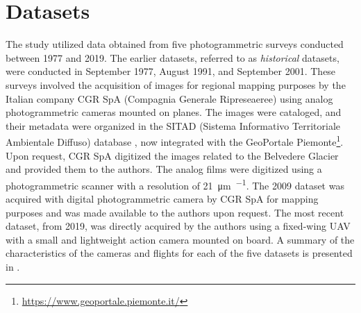 

\section{Datasets}\label{sec:2:datasets}

The study utilized data obtained from five photogrammetric surveys conducted between 1977 and 2019. The earlier datasets, referred to as \textit{historical} datasets, were conducted in September 1977, August 1991, and September 2001. 
These surveys involved the acquisition of images for regional mapping purposes by the Italian company CGR SpA (Compagnia Generale Ripreseaeree) using analog photogrammetric cameras mounted on planes. 
The images were cataloged, and their metadata were organized in the SITAD (Sistema Informativo Territoriale Ambientale Diffuso) database \citep{Cipriano2005_SITAD}, now integrated with the GeoPortale Piemonte\footnote{\url{ https://www.geoportale.piemonte.it/}}.
Upon request, CGR SpA digitized the images related to the Belvedere Glacier and provided them to the authors. 
The analog films were digitized using a photogrammetric scanner with a resolution of \SI{21}{\micro\meter\per\pixel}. 
The 2009 dataset was acquired with digital photogrammetric camera by CGR SpA for mapping purposes and was made available to the authors upon request.
The most recent dataset, from 2019, was directly acquired by the authors using a fixed-wing UAV with a small and lightweight action camera mounted on board. A summary of the characteristics of the cameras and flights for each of the five datasets is presented in .

